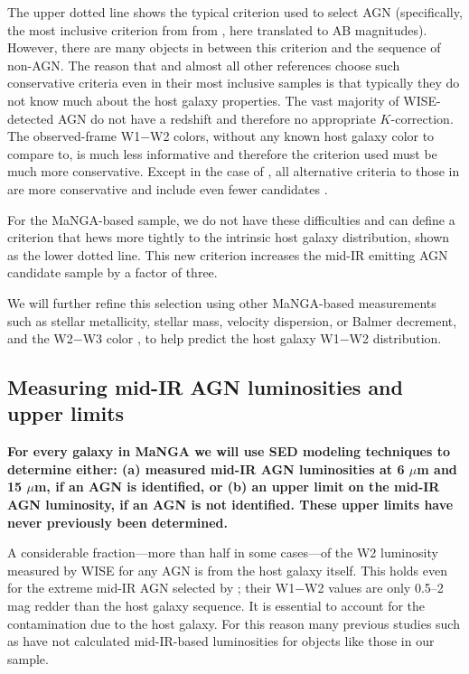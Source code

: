 \documentclass[12pt, preprint]{hacked-aastex}
\begin{document}
The upper dotted line shows the typical criterion used to select AGN
(specifically, the most inclusive criterion from from \cite{assef18a},
here translated to AB magnitudes). However, there are many objects in
between this criterion and the sequence of non-AGN. The reason that
\cite{assef18a} and almost all other references choose such
conservative criteria even in their most inclusive samples is that
typically they do not know much about the host galaxy properties.  The
vast majority of WISE-detected AGN do not have a redshift and
therefore no appropriate $K$-correction. The observed-frame W1$-$W2
colors, without any known host galaxy color to compare to, is much
less informative and therefore the criterion used must be much more
conservative. Except in the case of \cite{hviding22a}, all alternative
criteria to those in \cite{assef18a} are more conservative and include
even fewer candidates \cite{jarrett11a,stern12a}.

For the MaNGA-based sample, we do not have these difficulties and can
define a criterion that hews more tightly to the intrinsic host galaxy
distribution, shown as the lower dotted line. This new criterion
increases the mid-IR emitting AGN candidate sample by a factor of
three.

We will further refine this selection using other MaNGA-based
measurements such as stellar metallicity, stellar mass, velocity
dispersion, or Balmer decrement, and the W2$-$W3 color
\cite{hviding22a}, to help predict the host galaxy W1$-$W2
distribution.  

\subsection{Measuring mid-IR AGN luminosities and upper limits}
\label{sec:measurements}

{\bf For every galaxy in MaNGA we will use SED modeling techniques to
  determine either: (a) measured mid-IR AGN luminosities at 6 $\mu$m
  and 15 $\mu$m, if an AGN is identified, or (b) an upper limit on the
  mid-IR AGN luminosity, if an AGN is not identified.  These upper
  limits have never previously been determined.}

A considerable fraction---more than half in some cases---of the W2
luminosity measured by WISE for any AGN is from the host galaxy
itself.  This holds even for the extreme mid-IR AGN selected by
\cite{assef18a}; their W1$-$W2 values are only 0.5--2 mag redder than
the host galaxy sequence.  It is essential to account for the
contamination due to the host galaxy. For this reason many previous
studies such as \cite{hviding22a} have not calculated mid-IR-based
luminosities for objects like those in our sample.
\end{document}
